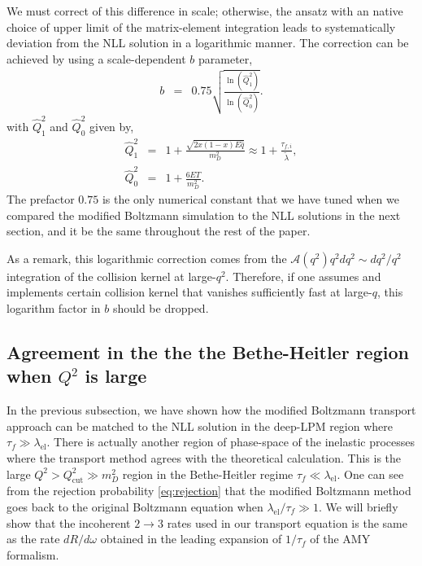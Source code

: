 \documentclass[aps, prc, reprint, amsmath, groupedaddress, nofootinbib]{revtex4-1}
\begin{document}
We must correct of this difference in scale; otherwise, the ansatz with an native choice of upper limit of the matrix-element integration leads to systematically deviation from the NLL solution in a logarithmic manner.
The correction can be achieved by using a scale-dependent $b$ parameter,
\begin{eqnarray}
b &=& 0.75\sqrt{\frac{\ln(\hat{Q}_1^2 )}{\ln(\hat{Q}_0^2 )}}.
\label{eq:NLL-b}
\end{eqnarray}
with $\hat{Q}_1^2$ and $\hat{Q}_0^2$ given by,
\begin{eqnarray}
\hat{Q}_1^2 &=& 1 + \frac{\sqrt{2x(1-x)E\hat{q}}}{m_D^2} \approx 1 + \frac{\tau_{f,i}}{\tilde{\lambda}}, \\ 
\hat{Q}_0^2 &=& 1 + \frac{6ET}{m_D^2}.
\end{eqnarray}
The prefactor $0.75$ is the only numerical constant that we have tuned when we compared the modified Boltzmann simulation to the NLL solutions in the next section, and it be the same throughout the rest of the paper.

As a remark, this logarithmic correction comes from the $\mathcal{A}(q^2) q^2 dq^2 \sim dq^2 /q^2$ integration of the collision kernel at large-$q^2$.
Therefore, if one assumes and implements certain collision kernel that vanishes sufficiently fast at large-$q$, this logarithm factor in $b$ should be dropped. 

\subsection{Agreement in the the the Bethe-Heitler region when $Q^2$ is large}
In the previous subsection, we have shown how the modified Boltzmann transport approach can be matched to the NLL solution in the deep-LPM region where $\tau_f \gg \lambda_{\textrm{el}}$.
There is actually another region of phase-space of the inelastic processes where the transport method agrees with the theoretical calculation.
This is the large $Q^2 > Q_{\textrm{cut}}^2 \gg m_D^2$ region in the Bethe-Heitler regime $\tau_f \ll \lambda_{\textrm{el}}$.
One can see from the rejection probability \ref{eq:rejection} that the modified Boltzmann method goes back to the original Boltzmann equation when $\lambda_{\textrm{el}}/\tau_f\gg 1$.
We will briefly show that the incoherent $2\rightarrow 3$ rates used in our transport equation is the same as the rate $dR/d\omega$ obtained in the leading expansion of  $1/\tau_f$ of the AMY formalism.
\end{document}

